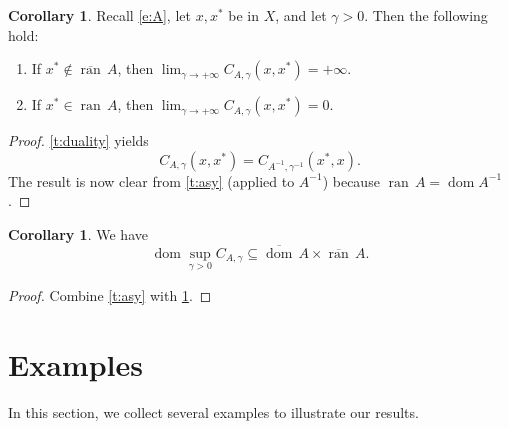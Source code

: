 \documentclass[12pt]{article}
\newcommand{\dom}{\ensuremath{\operatorname{dom}}}
\newcommand{\ran}{\ensuremath{{\operatorname{ran}}\,}}
\newcommand{\cdom}{\ensuremath{\overline{\operatorname{dom}}\,}}
\newcommand{\pinf}{\ensuremath{+\infty}}
\theoremstyle{definition}
\newtheorem{corollary}[theorem]{Corollary}
\providecommand{\ran}{\operatorname{ran}}
\providecommand{\dom}{\operatorname{dom}}
\providecommand{\ran}{\operatorname{ran}}
\newcommand{\cran}{\ensuremath{\overline{\operatorname{ran}}\,}}
\begin{document}
{\begin{corollary}
\label{c:asy}
Recall \cref{e:A}, let $x,x^*$ be in $X$, and let $\gamma>0$. 
Then the following hold: 
\begin{enumerate}
\item 
\label{c:asy1}
If $x^*\notin\cran A$, then $\lim_{\gamma\to \pinf} C_{A,\gamma}(x,x^*)
= \pinf$.
\item 
\label{c:asy2}
If $x^*\in\ran A$, then $\lim_{\gamma\to \pinf} C_{A,\gamma}(x,x^*)=0$. 
\end{enumerate}
\end{corollary}
\begin{proof}
\cref{t:duality} yields
\begin{equation}
C_{A,\gamma}(x,x^*) = C_{A^{-1},\gamma^{-1}}(x^*,x). 
\end{equation}
The result is now clear from \cref{t:asy} (applied to $A^{-1}$)
because $\ran A = \dom A^{-1}$. 
\end{proof}

\begin{corollary}
We have 
\begin{equation}
\dom \sup_{\gamma>0} C_{A,\gamma} \subseteq \cdom A \times \cran A.
\end{equation}
\end{corollary}
\begin{proof}
Combine \cref{t:asy} with \cref{c:asy}. 
\end{proof}




\section{Examples}
\label{sec:examples}

In this section, we collect several examples to illustrate our results.

}
\end{document}
